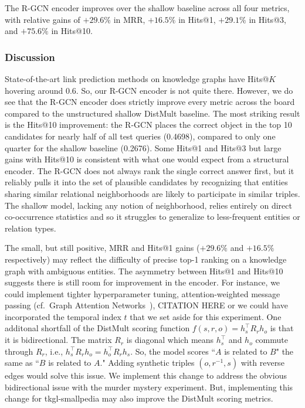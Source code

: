 \documentclass[11pt]{article}
\theoremstyle{definition}
\begin{document}
The R-GCN encoder improves over the shallow baseline across all
four metrics, with relative gains of $+29.6\%$ in MRR,
$+16.5\%$ in Hits@1, $+29.1\%$ in Hits@3, and $+75.6\%$
in Hits@10.

\subsubsection{Discussion}
\label{subsubsec:wikidata-discussion}

State-of-the-art link prediction methods on knowledge graphs have Hits@$K$ hovering around 0.6. So, our R-GCN encoder is not quite there. However, we do see that the R-GCN encoder does strictly improve every metric across the board compared to the unstructured shallow DistMult baseline. The most striking result is the Hits@10 improvement: the R-GCN
places the correct object in the top 10 candidates for nearly
half of all test queries (0.4698), compared to only one quarter
for the shallow baseline (0.2676). Some Hits@1 and Hits@3 but large gains with Hits@10 is consistent with what one would expect from a structural encoder.  The R-GCN does not
always rank the single correct answer first, but it reliably
pulls it into the set of plausible candidates by recognizing that
entities sharing similar relational neighborhoods are likely to
participate in similar triples.  The shallow model, lacking any
notion of neighborhood, relies entirely on direct co-occurrence
statistics and so it struggles to generalize to less-frequent
entities or relation types.



The small, but still positive, MRR and Hits@1 gains ($+29.6\%$ and $+16.5\%$ respectively) may reflect the difficulty of
precise top-1 ranking on a knowledge graph with ambiguous entities.
The asymmetry between Hits@1 and Hits@10 suggests there is still
room for improvement in the encoder. For instance, we could implement tighter hyperparameter tuning, attention-weighted message passing
(cf.\ Graph Attention Networks~\citep{velickovic2018graph}), CITATION HERE
or we could have incorporated the temporal index $t$ that we set aside for this
experiment. One additonal shortfall of the DistMult scoring function $f(s,r,o) = h_s^\top R_r h_o$ is that it is bidirectional. The matrix $R_r$ is diagonal which means $h_s^\top$ and $h_o$ commute through $R_r$, i.e., $h_s^\top R_rh_o = h_o^\top R_r h_s$. So, the model scores ``$A$ is related to $B$" the same as ``$B$ is related to $A$." Adding synthetic triples $(o,r^{-1}, s)$ with reverse edges would solve this issue. We implement this change to address the obvious bidirectional issue with the murder mystery experiment. But, implementing this change for tkgl-smallpedia may also improve the DistMult scoring metrics.
\end{document}
